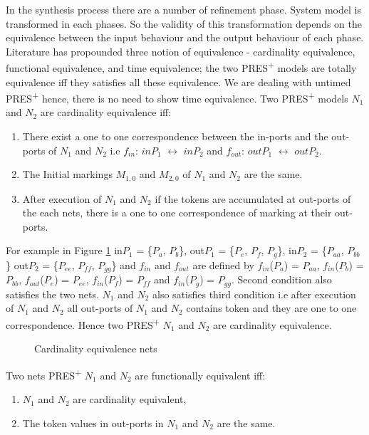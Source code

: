 \documentclass[9pt,executive]{article}
\def\presp{PRES\textsuperscript{+}}
\def\presp{PRES\textsuperscript{+}}
\begin{document}
In the synthesis process there are a  number of refinement phase. System model is transformed in each phases. 
So the validity of this transformation  depends on the equivalence between the input behaviour and the output behaviour of each phase. 
Literature \cite{zebo} has propounded three notion of equivalence - cardinality equivalence, functional equivalence, and time equivalence;
the two {\presp} models are totally equivalence iff they satisfies all these equivalence. We are dealing with untimed {\presp} hence, 
there is no need to show time equivalence.
Two {\presp} models  $N_1$ and $N_2$ are cardinality equivalence iff:
 \begin{enumerate}
   \item There exist a  one to one correspondence between the in-ports and the out-ports of $N_1$ and $N_2$ 
      i.e $f_{in}$: $inP_1$ $\leftrightarrow$ $inP_2$ and  $f_{out}$: $outP_1$ $\leftrightarrow$ $outP_2$.
   \item The Initial markings $M_{1, 0}$ and $M_{2, 0}$ of $N_1$ and $N_2$ are the same.
   \item After execution of $N_1$ and $N_2$ if the tokens are accumulated at out-ports of the each nets, there is 
         a one to one correspondence of marking at their out-ports. 
 \end{enumerate}
 For example in  Figure \ref{fig:n} in$P_1$ = \{$P_a$, $P_b$\}, out$P_1$ = \{$P_e$, $P_f$, $P_g$\}, 
in$P_2$ = \{$P_{aa}$, $P_{bb}$\} out$P_2$ = \{$P_{ee}$, $P_{ff}$, $P_{gg}$\} and $f_{in}$ and $f_{out}$ are defined by
$f_{in}$($P_a$) = $P_{aa}$, $f_{in}$($P_b$) = $P_{bb}$, $f_{out}$($P_e$) = $P_{ee}$, $f_{in}$($P_f$) = $P_{ff}$ and $f_{in}$($P_g$) = $P_{gg}$.
Second condition also satisfies the two nets. $N_1$ and $N_2$ also satisfies third condition i.e after execution of $N_1$ and $N_2$ 
all out-ports of $N_1$ and $N_2$ contains token and they are one to one correspondence. Hence two {\presp} $N_1$ and $N_2$ are cardinality 
equivalence. 
 \begin{figure}[htbp]
\centerline{}
\caption{Cardinality equivalence nets}
\label{fig:n}
\end{figure}
 
 Two nets {\presp} $N_1$ and $N_2$ are functionally equivalent iff:
\begin{enumerate}
 \item $N_1$ and $N_2$ are cardinality equivalent,
 \item The token values in out-ports in $N_1$ and $N_2$ are the same.
\end{enumerate}
 
\end{document}
